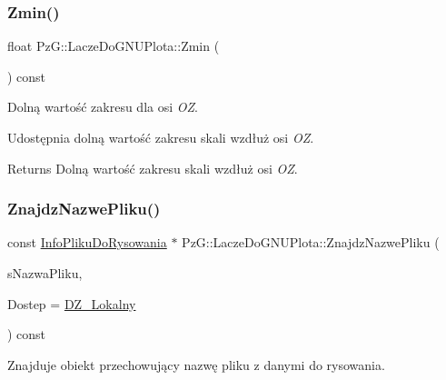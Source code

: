 \subsubsection{\texorpdfstring{Zmin()}{Zmin()}}
{\footnotesize\ttfamily float Pz\+G\+::\+Lacze\+Do\+G\+N\+U\+Plota\+::\+Zmin (\begin{DoxyParamCaption}{ }\end{DoxyParamCaption}) const\hspace{0.3cm}{\ttfamily [inline]}}



Dolną wartość zakresu dla osi {\itshape OZ}. 

Udostępnia dolną wartość zakresu skali wzdłuż osi {\itshape OZ}. \begin{DoxyReturn}{Returns}
Dolną wartość zakresu skali wzdłuż osi {\itshape OZ}. 
\end{DoxyReturn}
\mbox{\label{class_pz_g_1_1_lacze_do_g_n_u_plota_a9f64d84045ed54664807420e755a1ec5}} 
\subsubsection{\texorpdfstring{ZnajdzNazwePliku()}{ZnajdzNazwePliku()}\hspace{0.1cm}{\footnotesize\ttfamily [1/4]}}
{\footnotesize\ttfamily const \mbox{\hyperlink{class_pz_g_1_1_info_pliku_do_rysowania}{Info\+Pliku\+Do\+Rysowania}} $\ast$ Pz\+G\+::\+Lacze\+Do\+G\+N\+U\+Plota\+::\+Znajdz\+Nazwe\+Pliku (\begin{DoxyParamCaption}\item[{const char $\ast$}]{s\+Nazwa\+Pliku,  }\item[{\mbox{\hyperlink{namespace_pz_g_af74528dea7061dcb07cf44f315703cf4}{Typ\+Dostepu\+Do\+Zasobu}}}]{Dostep = {\ttfamily \mbox{\hyperlink{namespace_pz_g_af74528dea7061dcb07cf44f315703cf4ab239a07233614b519b0f2f5ca8af7826}{D\+Z\+\_\+\+Lokalny}}} }\end{DoxyParamCaption}) const}



Znajduje obiekt przechowujący nazwę pliku z danymi do rysowania. 

